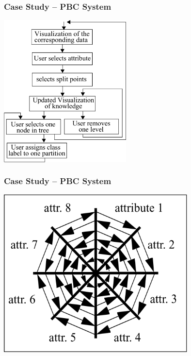 \documentclass[xcolor=svgnames]{beamer}
\begin{document}
\begin{frame}
	\frametitle{Case Study -- PBC System}
	\begin{center}
		\includegraphics[width=0.5\textwidth]{img/pbc-diagram.png}
	\end{center}
\end{frame}
\begin{frame}
	\frametitle{Case Study -- PBC System}
	\begin{center}
		\includegraphics[width=0.75\textwidth]{img/pbc-circle-segments.png}
	\end{center}
\end{frame}
\end{document}

